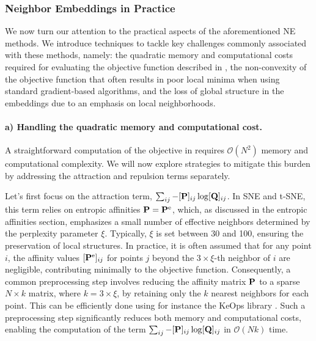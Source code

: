 \subsubsection{Neighbor Embeddings in Practice}

We now turn our attention to the practical aspects of the aforementioned NE methods. We introduce techniques to tackle key challenges commonly associated with these methods, namely: the quadratic memory and computational costs required for evaluating the objective function described in , the non-convexity of the objective function that often results in poor local minima when using standard gradient-based algorithms, and the loss of global structure in the embeddings due to an emphasis on local neighborhoods.

\paragraph{a) Handling the quadratic memory and computational cost.}
A straightforward computation of the objective in  requires $\mathcal{O}(N^2)$ memory and computational complexity. We will now explore strategies to mitigate this burden by addressing the attraction and repulsion terms separately.

Let's first focus on the attraction term, \(\sum_{ij} -[{\mathbf{P}}]_{ij} \log [{\mathbf{Q}}]_{ij}\). In SNE and t-SNE, this term relies on entropic affinities \ie \({\mathbf{P}} = {\mathbf{P}}^{\mathrm{e}}\), which, as discussed in the entropic affinities section, emphasizes a small number of effective neighbors determined by the perplexity parameter \(\xi\). Typically, \(\xi\) is set between 30 and 100, ensuring the preservation of local structures. In practice, it is often assumed that for any point \(i\), the affinity values \([{\mathbf{P}}^{\mathrm{e}}]_{ij}\) for points \(j\) beyond the \(3 \times \xi\)-th neighbor of \(i\) are negligible, contributing minimally to the objective function. Consequently, a common preprocessing step involves reducing the affinity matrix \({\mathbf{P}}\) to a sparse \(N \times k\) matrix, where \(k = 3 \times \xi\), by retaining only the \(k\) nearest neighbors for each point. This can be efficiently done using for instance the KeOps library \citep{charlier2021kernel}. Such a preprocessing step significantly reduces both memory and computational costs, enabling the computation of the term \(\sum_{ij} -[{\mathbf{P}}]_{ij} \log [{\mathbf{Q}}]_{ij}\) in \(\mathcal{O}(Nk)\) time.


